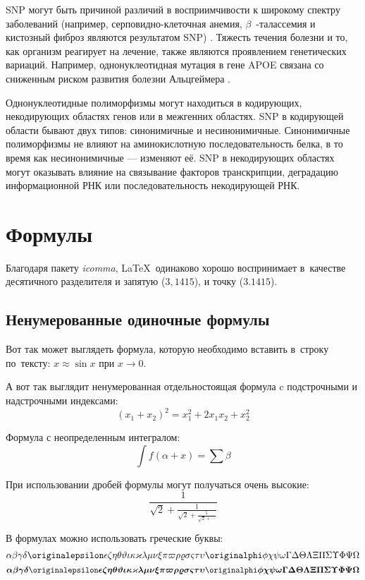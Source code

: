 SNP могут быть причиной различий в восприимчивости к широкому спектру заболеваний (например, серповидно-клеточная анемия, $\beta$~-талассемия и кистозный фиброз являются результатом SNP) \autocite{INGRAM1956, Chang1979, Reiss1993}. Тяжесть течения болезни и то, как организм реагирует на лечение, также являются проявлением генетических вариаций. Например, однонуклеотидная мутация в гене APOE связана со сниженным риском развития болезни Альцгеймера \autocite{Wolf2013}.

Однонуклеотидные полиморфизмы могут находиться в кодирующих, некодирующих областях генов или в межгенних областях. SNP в кодирующей области бывают двух типов: синонимичные и несинонимичные. Синонимичные полиморфизмы не влияют на аминокислотную последовательность белка, в то время как несинонимичные --- изменяют её. SNP в некодирующих областях могут оказывать влияние на связывание факторов транскрипции, деградацию информационной РНК или последовательность некодирующей РНК. 




\section{Формулы}\label{sec:ch1/sec3}

Благодаря пакету \textit{icomma}, \LaTeX~одинаково хорошо воспринимает
в~качестве десятичного разделителя и запятую (\(3,1415\)), и точку (\(3.1415\)).

\subsection{Ненумерованные одиночные формулы}\label{subsec:ch1/sec3/sub1}

Вот так может выглядеть формула, которую необходимо вставить в~строку
по~тексту: \(x \approx \sin x\) при \(x \to 0\).

А вот так выглядит ненумерованная отдельностоящая формула c подстрочными
и надстрочными индексами:
\[
(x_1+x_2)^2 = x_1^2 + 2 x_1 x_2 + x_2^2
\]

Формула с неопределенным интегралом:
\[
\int f(\alpha+x)=\sum\beta
\]

При использовании дробей формулы могут получаться очень высокие:
\[
  \frac{1}{\sqrt{2}+
  \displaystyle\frac{1}{\sqrt{2}+
  \displaystyle\frac{1}{\sqrt{2}+\cdots}}}
\]

В формулах можно использовать греческие буквы:
\[
\alpha\beta\gamma\delta\originalepsilon\epsilon\zeta\eta\theta%
\vartheta\iota\kappa\varkappa\lambda\mu\nu\xi\pi\varpi\rho\varrho%
\sigma\varsigma\tau\upsilon\originalphi\phi\chi\psi\omega\Gamma\Delta%
\Theta\Lambda\Xi\Pi\Sigma\Upsilon\Phi\Psi\Omega
\]
\[%
\boldsymbol{\alpha\beta\gamma\delta\originalepsilon\epsilon\zeta\eta%
\theta\vartheta\iota\kappa\varkappa\lambda\mu\nu\xi\pi\varpi\rho%
\varrho\sigma\varsigma\tau\upsilon\originalphi\phi\chi\psi\omega\Gamma%
\Delta\Theta\Lambda\Xi\Pi\Sigma\Upsilon\Phi\Psi\Omega}
\]

